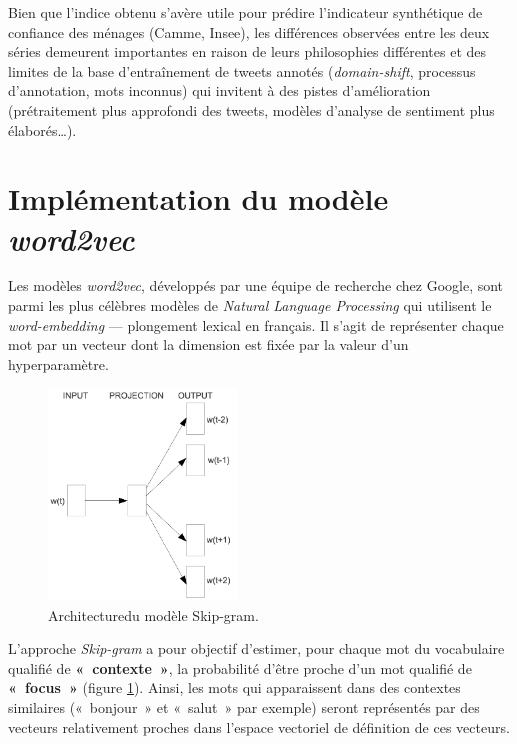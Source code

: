 \documentclass[10pt,french,french]{article}
\begin{document}
\begin{figure}[htb]

\end{figure}

Bien que l'indice obtenu s'avère utile pour prédire l'indicateur
synthétique de confiance des ménages (Camme, Insee), les différences
observées entre les deux séries demeurent importantes en raison de leurs
philosophies différentes et des limites de la base d'entraînement de
tweets annotés (\emph{domain-shift}, processus d'annotation, mots
inconnus) qui invitent à des pistes d'amélioration (prétraitement plus
approfondi des tweets, modèles d'analyse de sentiment plus
élaborés\dots).

\newpage

\section{\texorpdfstring{Implémentation du modèle
\emph{word2vec}}{Implémentation du modèle word2vec}}\label{sec:word2vec}

Les modèles \emph{word2vec}, développés par une équipe de recherche chez
Google, sont parmi les plus célèbres modèles de \emph{Natural Language
Processing} qui utilisent le \emph{word-embedding} --- plongement
lexical en français. Il s'agit de représenter chaque mot par un vecteur
dont la dimension est fixée par la valeur d'un hyperparamètre.

\begin{figure}
\includegraphics[width=5cm]{img/skip_gram.png}
\captionsetup{margin=0cm,format=hang,justification=justified}
\caption{Architecture\newline du modèle Skip-gram.}\label{fig:skipgram}
\end{figure}

L'approche \emph{Skip-gram} a pour objectif d'estimer, pour chaque mot
du vocabulaire qualifié de \textbf{«~contexte~»}, la probabilité d'être
proche d'un mot qualifié de \textbf{«~focus~»} (figure
\ref{fig:skipgram}). Ainsi, les mots qui apparaissent dans des contextes
similaires («~bonjour~» et «~salut~» par exemple) seront représentés par
des vecteurs relativement proches dans l'espace vectoriel de définition
de ces vecteurs.
\end{document}
